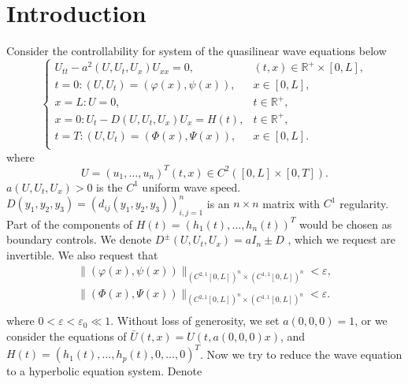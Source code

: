 \documentclass[a4paper,reqno,11pt]{amsart}
\numberwithin{equation}{section} %
\begin{document}
\section{Introduction}\label{intro sec}
Consider the controllability for system of the quasilinear wave equations below
\begin{equation}\label{42}
    \begin{cases}
	U_{tt}-a^2\left( U,U_t,U_x \right) U_{xx}=0,&		\left( t,x \right) \in \mathbb{R}^+\times \left[ 0,L \right] ,\\
	t=0:\left( U,U_t \right) =\left( \varphi  \left( x \right) ,\psi \left( x \right) \right) ,&		x\in \left[ 0,L \right] ,\\
	x=L:U=0,&		t\in \mathbb{R}^+,\\
	x=0:U_t-D\left( U,U_t,U_x \right) U_x=H\left( t \right) ,&		t\in \mathbb{R}^+,\\
	t=T:\left( U,U_t \right) =\left( \varPhi   \left( x \right) ,\varPsi  \left( x \right) \right) ,&		x\in \left[ 0,L \right] .\\
\end{cases}
\end{equation}
where
$$
U=\left(u_1, \ldots, u_n\right)^T(t, x) \in C^2([0,L]\times [0,T]) .
$$
$a\left(U, U_t, U_x\right)>0$ is the $C^1$ uniform wave speed. $D\left(y_1, y_2, y_3\right)=\left(d_{i j}\left(y_1, y_2, y_3\right)\right)_{i, j=1}^n$ is an   $n \times n$ matrix with $C^1$ regularity. Part of the components of $H(t)=\left(h_1(t), \ldots, h_n(t)\right)^T$ would be chosen as boundary controls. We denote $D^{\pm}\left( U,U_t,U_x \right) =a I_n \pm D $ , which we request are invertible. We also request that
$$
\begin{aligned}
	\lVert \left( \varphi  \left( x \right) ,\psi \left( x \right) \right) \rVert _{\left( C^{2,1}\left[ 0,L \right] \right) ^n\times \left( C^{1,1}\left[ 0,L \right] \right) ^n}  < \varepsilon ,\\
	\lVert \left( \varPhi   \left( x \right) ,\varPsi \left( x \right) \right) \rVert _{\left( C^{2,1}\left[ 0,L \right] \right) ^n\times \left( C^{1,1}\left[ 0,L \right] \right) ^n}  < \varepsilon .\\
\end{aligned}
$$
where $0 < \varepsilon < \varepsilon _0 \ll 1$.
Without loss of generosity, we set $a(0,0,0)=1$, or we consider the equations of $\bar{U}\left( t,x \right) =U\left( t,a\left( 0,0,0 \right) x \right) $, and $H(t)=\left(h_1(t), \ldots, h_p(t), 0, \ldots, 0\right)^T$. Now we try to reduce the wave equation to a hyperbolic equation system. Denote
\end{document}
